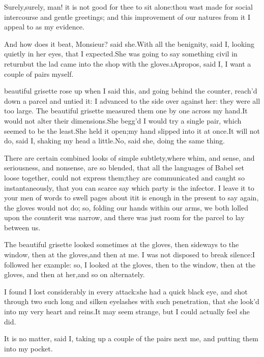 \documentclass[twoside]{article}
\begin{document}
\tsk Surely,\tsk surely, man! it is not good for thee to sit alone:\tsk thou wast
made for social intercourse and gentle greetings; and this improvement of
our natures from it I appeal to as my evidence.

\tsk And how does it beat, Monsieur? said she.\tsk With all the benignity, said
I, looking quietly in her eyes, that I expected.\tsk She was going to say
something civil in return\tsk but the lad came into the shop with the
gloves.\tsk \i{Apropos}, said I, I want a couple of pairs myself.






 beautiful grisette rose up when I said this, and going behind the
counter, reach’d down a parcel and untied it: I advanced to the side over
against her: they were all too large.  The beautiful grisette measured
them one by one across my hand.\tsk It would not alter their dimensions.\tsk She
begg’d I would try a single pair, which seemed to be the least.\tsk She held
it open;\tsk my hand slipped into it at once.\tsk It will not do, said I, shaking
my head a little.\tsk No, said she, doing the same thing.

There are certain combined looks of simple subtlety,\tsk where whim, and
sense, and seriousness, and nonsense, are so blended, that all the
languages of Babel set loose together, could not express them;\tsk they are
communicated and caught so instantaneously, that you can scarce say which
party is the infector.  I leave it to your men of words to swell pages
about it\tsk it is enough in the present to say again, the gloves would not
do; so, folding our hands within our arms, we both lolled upon the
counter\tsk it was narrow, and there was just room for the parcel to lay
between us.

The beautiful grisette looked sometimes at the gloves, then sideways to
the window, then at the gloves,\tsk and then at me.  I was not disposed to
break silence:\tsk I followed her example: so, I looked at the gloves, then
to the window, then at the gloves, and then at her,\tsk and so on
alternately.

I found I lost considerably in every attack:\tsk she had a quick black eye,
and shot through two such long and silken eyelashes with such
penetration, that she look’d into my very heart and reins.\tsk It may seem
strange, but I could actually feel she did.\tsk 

It is no matter, said I, taking up a couple of the pairs next me, and
putting them into my pocket.
\end{document}

